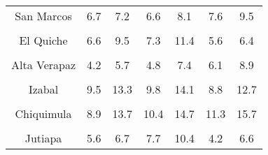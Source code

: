 \begin{tabular}[t]{ccccccc}
San Marcos & 6.7 & 7.2 & 6.6 & 8.1 & 7.6 & 9.5\\
\cellcolor[HTML]{B6B3FF}{Huehuetenango} & \cellcolor[HTML]{B6B3FF}{9.7} & \cellcolor[HTML]{B6B3FF}{13.0} & \cellcolor[HTML]{B6B3FF}{9.0} & \cellcolor[HTML]{B6B3FF}{12.5} & \cellcolor[HTML]{B6B3FF}{7.5} & \cellcolor[HTML]{B6B3FF}{11.2}\\
El Quiche & 6.6 & 9.5 & 7.3 & 11.4 & 5.6 & 6.4\\
\cellcolor[HTML]{B6B3FF}{Baja Verapaz} & \cellcolor[HTML]{B6B3FF}{6.5} & \cellcolor[HTML]{B6B3FF}{10.1} & \cellcolor[HTML]{B6B3FF}{9.0} & \cellcolor[HTML]{B6B3FF}{13.0} & \cellcolor[HTML]{B6B3FF}{6.1} & \cellcolor[HTML]{B6B3FF}{11.0}\\
Alta Verapaz & 4.2 & 5.7 & 4.8 & 7.4 & 6.1 & 8.9\\
\cellcolor[HTML]{B6B3FF}{Petén} & \cellcolor[HTML]{B6B3FF}{12.7} & \cellcolor[HTML]{B6B3FF}{17.5} & \cellcolor[HTML]{B6B3FF}{14.2} & \cellcolor[HTML]{B6B3FF}{22.5} & \cellcolor[HTML]{B6B3FF}{11.4} & \cellcolor[HTML]{B6B3FF}{18.5}\\
Izabal & 9.5 & 13.3 & 9.8 & 14.1 & 8.8 & 12.7\\
\cellcolor[HTML]{B6B3FF}{Zacapa} & \cellcolor[HTML]{B6B3FF}{6.5} & \cellcolor[HTML]{B6B3FF}{10.5} & \cellcolor[HTML]{B6B3FF}{6.8} & \cellcolor[HTML]{B6B3FF}{10.6} & \cellcolor[HTML]{B6B3FF}{8.6} & \cellcolor[HTML]{B6B3FF}{12.2}\\
Chiquimula & 8.9 & 13.7 & 10.4 & 14.7 & 11.3 & 15.7\\
\cellcolor[HTML]{B6B3FF}{Jalapa} & \cellcolor[HTML]{B6B3FF}{10.8} & \cellcolor[HTML]{B6B3FF}{16.8} & \cellcolor[HTML]{B6B3FF}{11.8} & \cellcolor[HTML]{B6B3FF}{16.8} & \cellcolor[HTML]{B6B3FF}{7.4} & \cellcolor[HTML]{B6B3FF}{10.4}\\
Jutiapa & 5.6 & 6.7 & 7.7 & 10.4 & 4.2 & 6.6\\
\bottomrule
\end{tabular}
